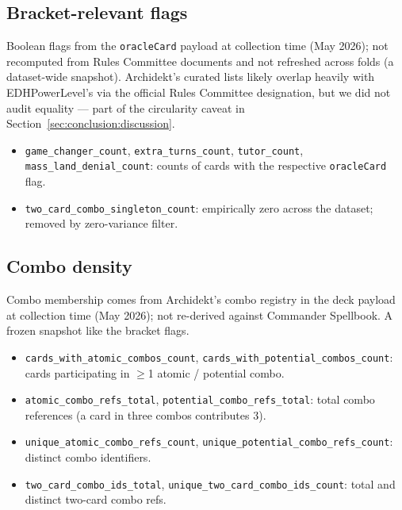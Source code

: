 \documentclass{article}
\begin{document}
\subsection{Bracket-relevant flags}
\label{app:features:bracket}
Boolean flags from the \texttt{oracleCard} payload at collection time (May 2026); not recomputed from Rules Committee documents and not refreshed across folds (a dataset-wide snapshot). Archidekt's curated lists likely overlap heavily with EDHPowerLevel's via the official Rules Committee designation, but we did not audit equality --- part of the circularity caveat in Section~\ref{sec:conclusion:discussion}.
\begin{itemize}\itemsep0pt
  \item \texttt{game\_changer\_count}, \texttt{extra\_turns\_count}, \texttt{tutor\_count}, \texttt{mass\_land\_denial\_count}: counts of cards with the respective \texttt{oracleCard} flag.
  \item \texttt{two\_card\_combo\_singleton\_count}: empirically zero across the dataset; removed by zero-variance filter.
\end{itemize}

\subsection{Combo density}
\label{app:features:combos}
Combo membership comes from Archidekt's combo registry in the deck payload at collection time (May 2026); not re-derived against Commander Spellbook. A frozen snapshot like the bracket flags.
\begin{itemize}\itemsep0pt
  \item \texttt{cards\_with\_atomic\_combos\_count}, \texttt{cards\_with\_potential\_combos\_count}: cards participating in $\geq$1 atomic / potential combo.
  \item \texttt{atomic\_combo\_refs\_total}, \texttt{potential\_combo\_refs\_total}: total combo references (a card in three combos contributes 3).
  \item \texttt{unique\_atomic\_combo\_refs\_count}, \texttt{unique\_potential\_combo\_refs\_count}: distinct combo identifiers.
  \item \texttt{two\_card\_combo\_ids\_total}, \texttt{unique\_two\_card\_combo\_ids\_count}: total and distinct two-card combo refs.
\end{itemize}
\end{document}
